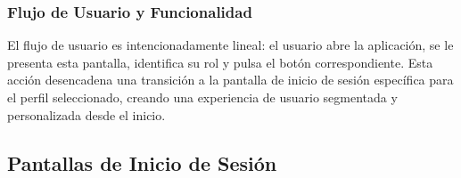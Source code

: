 \begin{samepage}
	\subsubsection*{Flujo de Usuario y Funcionalidad}
	El flujo de usuario es intencionadamente lineal: el usuario abre la aplicación, se le presenta esta pantalla, identifica su rol y pulsa el botón correspondiente. Esta acción desencadena una transición a la pantalla de inicio de sesión específica para el perfil seleccionado, creando una experiencia de usuario segmentada y personalizada desde el inicio.
\normalsize\end{samepage}
\clearpage


\subsection{ Pantallas de Inicio de Sesión}
